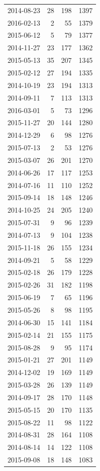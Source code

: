 \begin{tabular}{lrrr}
2014-08-23 & 28 & 198 & 1397 \\
2016-02-13 & 2 & 55 & 1379 \\
2015-06-12 & 5 & 79 & 1377 \\
2014-11-27 & 23 & 177 & 1362 \\
2015-05-13 & 35 & 207 & 1345 \\
2015-02-12 & 27 & 194 & 1335 \\
2014-10-19 & 23 & 194 & 1313 \\
2014-09-11 & 7 & 113 & 1313 \\
2016-03-01 & 5 & 73 & 1296 \\
2015-11-27 & 20 & 144 & 1280 \\
2014-12-29 & 6 & 98 & 1276 \\
2015-07-13 & 2 & 53 & 1276 \\
2015-03-07 & 26 & 201 & 1270 \\
2014-06-26 & 17 & 117 & 1253 \\
2014-07-16 & 11 & 110 & 1252 \\
2015-09-14 & 18 & 148 & 1246 \\
2014-10-25 & 24 & 205 & 1240 \\
2015-07-31 & 9 & 96 & 1239 \\
2014-07-13 & 9 & 104 & 1238 \\
2015-11-18 & 26 & 155 & 1234 \\
2014-09-21 & 5 & 58 & 1229 \\
2015-02-18 & 26 & 179 & 1228 \\
2015-02-26 & 31 & 182 & 1198 \\
2015-06-19 & 7 & 65 & 1196 \\
2015-05-26 & 8 & 98 & 1195 \\
2014-06-30 & 15 & 141 & 1184 \\
2015-02-14 & 21 & 155 & 1175 \\
2015-08-28 & 9 & 95 & 1174 \\
2015-01-21 & 27 & 201 & 1149 \\
2014-12-02 & 19 & 169 & 1149 \\
2015-03-28 & 26 & 139 & 1149 \\
2014-09-17 & 28 & 170 & 1148 \\
2015-05-15 & 20 & 170 & 1135 \\
2015-08-22 & 11 & 98 & 1122 \\
2014-08-31 & 28 & 164 & 1108 \\
2014-08-14 & 14 & 122 & 1108 \\
2015-09-08 & 18 & 148 & 1083 \\

\end{tabular}

